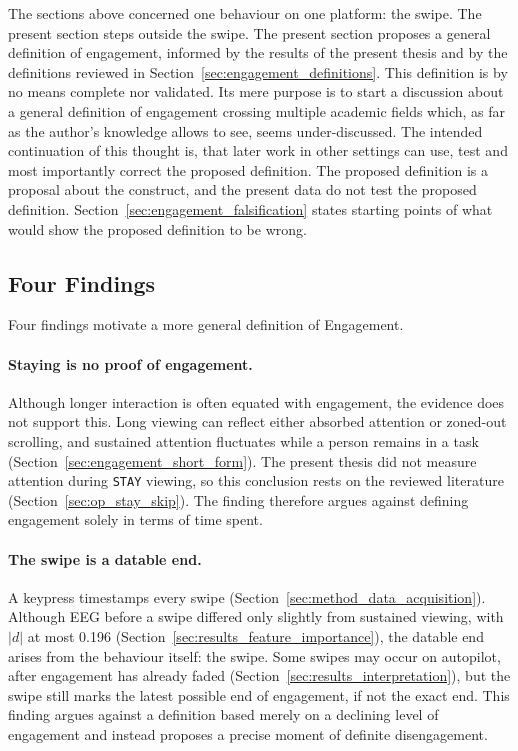 \documentclass[12pt,a4paper]{report}
\begin{document}
The sections above concerned one behaviour on one platform: the swipe. The present section steps outside the swipe. The present section proposes a general definition of engagement, informed by the results of the present thesis and by the definitions reviewed in Section~\ref{sec:engagement_definitions}. This definition is by no means complete nor validated. Its mere purpose is to start a discussion about a general definition of engagement crossing multiple academic fields which, as far as the author's knowledge allows to see, seems under-discussed. The intended continuation of this thought is, that later work in other settings can use, test and most importantly correct the proposed definition. The proposed definition is a proposal about the construct, and the present data do not test the proposed definition. Section~\ref{sec:engagement_falsification} states starting points of what would show the proposed definition to be wrong.

\subsection{Four Findings}
\label{sec:engagement_constraints}

Four findings motivate a more general definition of Engagement.

\paragraph{Staying is no proof of engagement.}
Although longer interaction is often equated with engagement, the evidence does not support this. Long viewing can reflect either absorbed attention or zoned-out scrolling, and sustained attention fluctuates while a person remains in a task (Section~\ref{sec:engagement_short_form}). The present thesis did not measure attention during \texttt{STAY} viewing, so this conclusion rests on the reviewed literature (Section~\ref{sec:op_stay_skip}). The finding therefore argues against defining engagement solely in terms of time spent.

\paragraph{The swipe is a datable end.}
A keypress timestamps every swipe (Section~\ref{sec:method_data_acquisition}). Although EEG before a swipe differed only slightly from sustained viewing, with \(|d|\) at most 0.196 (Section~\ref{sec:results_feature_importance}), the datable end arises from the behaviour itself: the swipe. Some swipes may occur on autopilot, after engagement has already faded (Section~\ref{sec:results_interpretation}), but the swipe still marks the latest possible end of engagement, if not the exact end. This finding argues against a definition based merely on a declining level of engagement and instead proposes a precise moment of definite disengagement.
\end{document}
